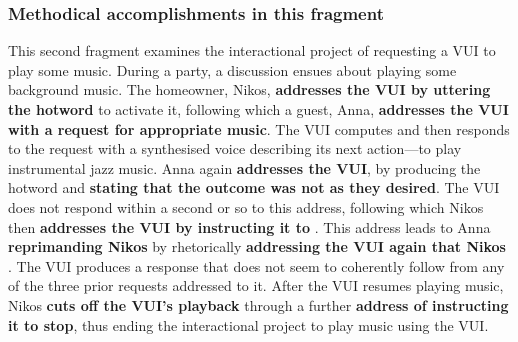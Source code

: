 


\subsubsection{Methodical accomplishments in this fragment}\label{sec:empirical home findings music methods}
\begin{revisedsubmission}
This second fragment examines the interactional project of requesting a \ac{VUI} to play some music.
During a party, a discussion ensues about playing some background music.
The homeowner, Nikos, \textbf{addresses the \ac{VUI} by uttering the hotword} to activate it, following which a guest, Anna, \textbf{addresses the \ac{VUI} with a request for appropriate music}.
The \ac{VUI} computes and then responds to the request with a synthesised voice describing its next action---to play instrumental jazz music.
Anna again \textbf{addresses the \ac{VUI}}, by producing the hotword and \textbf{stating that the outcome was not as they desired}.
The \ac{VUI} does not respond within a second or so to this address, following which Nikos then \textbf{addresses the \ac{VUI} by instructing it to }.
This address leads to Anna \textbf{reprimanding Nikos} by rhetorically \textbf{addressing the \ac{VUI} again that Nikos }.
The \ac{VUI} produces a response that does not seem to coherently follow from any of the three prior requests addressed to it.
After the \ac{VUI} resumes playing music, Nikos \textbf{cuts off the \ac{VUI}'s playback} through a further \textbf{address of instructing it to stop}, thus ending the interactional project to play music using the \ac{VUI}.
\end{revisedsubmission}






